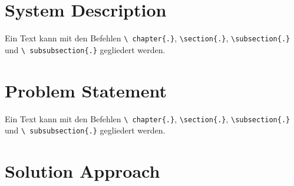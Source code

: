 \section{System Description}
\label{sec:intro-sys_description}

Ein Text kann mit den Befehlen \texttt{\textbackslash
chapter\{.\}}, \texttt{\textbackslash section\{.\}},
\texttt{\textbackslash subsection\{.\}} und \texttt{\textbackslash
subsubsection\{.\}} gegliedert werden.

\section{Problem Statement}
\label{sec:intro_prob_statement}

Ein Text kann mit den Befehlen \texttt{\textbackslash
chapter\{.\}}, \texttt{\textbackslash section\{.\}},
\texttt{\textbackslash subsection\{.\}} und \texttt{\textbackslash
subsubsection\{.\}} gegliedert werden.

\section{Solution Approach}
\label{sec:intro_sol_approach}
